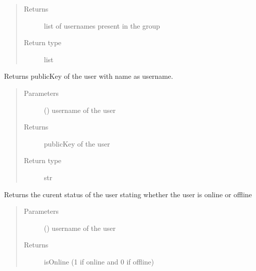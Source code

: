 \documentclass[letterpaper,10pt,english]{sphinxmanual}
\begin{document}
\begin{fulllineitems}
\begin{fulllineitems}
\begin{quote}
\begin{description}
\item[{Returns}] \leavevmode
list of usernames present in the group

\item[{Return type}] \leavevmode
list

\end{description}\end{quote}

\end{fulllineitems}


\begin{fulllineitems}
\label{\detokenize{sql:sql.Database.get_key}}
Returns publicKey of the user with name as username.
\begin{quote}\begin{description}
\item[{Parameters}] \leavevmode
{} () \textendash{} username of the user

\item[{Returns}] \leavevmode
publicKey of the user

\item[{Return type}] \leavevmode
str

\end{description}\end{quote}

\end{fulllineitems}


\begin{fulllineitems}
\label{\detokenize{sql:sql.Database.get_status}}
Returns the curent status of the user stating whether the user is online or offline
\begin{quote}\begin{description}
\item[{Parameters}] \leavevmode
{} () \textendash{} username of the user

\item[{Returns}] \leavevmode
isOnline (1 if online and 0 if offline)


\end{description}
\end{quote}
\end{fulllineitems}
\end{fulllineitems}
\end{document}
